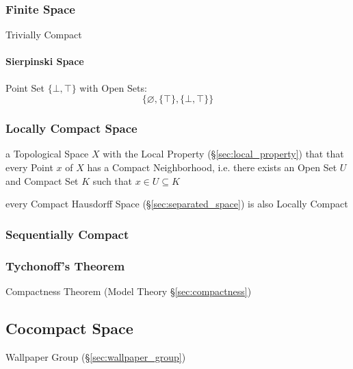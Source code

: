 \subsubsection{Finite Space}\label{sec:finite_space}

Trivially Compact



\paragraph{Sierpinski Space}\label{sec:sierpinski_space}\hfill

Point Set $\{ \bot, \top \}$ with Open Sets:
\[
  \{ \varnothing, \{\top\}, \{\bot, \top\} \}
\]



\subsubsection{Locally Compact Space}\label{sec:locally_compact}

a Topological Space $X$ with the Local Property (\S\ref{sec:local_property})
that that every Point $x$ of $X$ has a Compact Neighborhood, i.e. there exists
an Open Set $U$ and Compact Set $K$ such that $x \in U \subseteq K$

every Compact Hausdorff Space (\S\ref{sec:separated_space}) is also Locally
Compact



\subsubsection{Sequentially Compact}\label{sec:sequentially_compact}

\subsubsection{Tychonoff's Theorem}\label{sec:tychonoffs_theorem}

Compactness Theorem (Model Theory \S\ref{sec:compactness})



\subsection{Cocompact Space}\label{sec:cocompact_space}

Wallpaper Group (\S\ref{sec:wallpaper_group})

